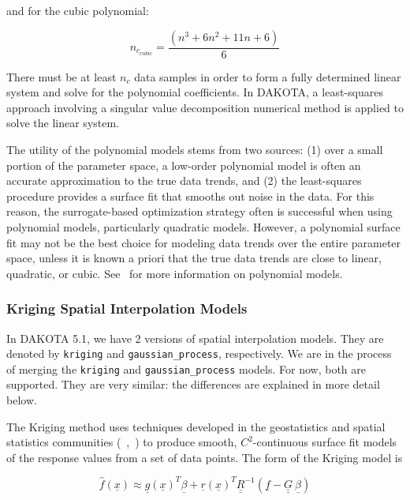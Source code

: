 and for the cubic polynomial:

\begin{equation}
  n_{c_{cubic}}=\frac{(n^{3}+6 n^{2}+11 n+6)}{6}
  \label{models:surf:equation06}
\end{equation}

There must be at least $n_{c}$ data samples in order to form a fully
determined linear system and solve for the polynomial coefficients. In
DAKOTA, a least-squares approach involving a singular value
decomposition numerical method is applied to solve the linear system.

The utility of the polynomial models stems from two sources: (1) over
a small portion of the parameter space, a low-order polynomial model
is often an accurate approximation to the true data trends, and (2)
the least-squares procedure provides a surface fit that smooths out
noise in the data. For this reason, the surrogate-based optimization
strategy often is successful when using polynomial models,
particularly quadratic models. However, a polynomial surface fit may
not be the best choice for modeling data trends over the entire
parameter space, unless it is known a priori that the true data trends
are close to linear, quadratic, or cubic. See~\cite{Mye95} for more
information on polynomial models.

\subsubsection{Kriging Spatial Interpolation Models}\label{models:surf:kriging}

In DAKOTA 5.1, we have 2 versions of spatial interpolation models.
They are denoted by \texttt{kriging} and \texttt{gaussian\_process},
 respectively.  We are in the process of merging the \texttt{kriging}
and \texttt{gaussian\_process} models.  For now, both are supported.
They are very similar:  the differences are explained in more detail below.

The Kriging method uses techniques developed in the geostatistics and
spatial statistics communities (~\cite{Cre91},~\cite{Koe96}) to produce
smooth, $C^{2}$-continuous surface fit models of the response values
from a set of data points. The form of the Kriging model is

\begin{equation}
  \hat{f}(\underline{x}) \approx \underline{g}(\underline{x})^T\underline{\beta} +
  \underline{r}(\underline{x})^{T}\underline{\underline{R}}^{-1}(\underline{f}-\underline{\underline{G}}\ \underline{\beta})
  \label{models:surf:equation08}
\end{equation}

